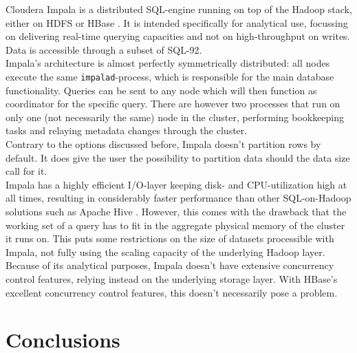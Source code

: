 \documentclass{IEEEtran}
\begin{document}
Cloudera Impala is a distributed SQL-engine running on top of the Hadoop stack, either on HDFS or HBase \cite{cloudera_impala}. It is intended specifically for analytical use, focussing on delivering real-time querying capacities and not on high-throughput on writes.
\\Data is accessible through a subset of SQL-92.
\\Impala's architecture is almost perfectly symmetrically distributed: all nodes execute the same \texttt{impalad}-process, which is responsible for the main database functionality. Queries can be sent to any node which will then function as coordinator for the specific query. There are however two processes that run on only one (not necessarily the same) node in the cluster, performing bookkeeping tasks and relaying metadata changes through the cluster\cite{impala_components}.
\\Contrary to the options discussed before, Impala doesn't partition rows by default. It does give the user the possibility to partition data should the data size call for it\cite{impala_partitioning}.
\\Impala has a highly efficient I/O-layer keeping disk- and CPU-utilization high at all times, resulting in considerably faster performance than other SQL-on-Hadoop solutions such as Apache Hive \cite{floratou2014sql}. However, this comes with the drawback that the working set of a query has to fit in the aggregate physical memory of the cluster it runs on. This puts some restrictions on the size of datasets processible with Impala, not fully using the scaling capacity of the underlying Hadoop layer.
\\Because of its analytical purposes, Impala doesn't have extensive concurrency control features, relying instead on the underlying storage layer. With HBase's excellent concurrency control features, this doesn't necessarily pose a problem.
 
\section{Conclusions}
\end{document}
